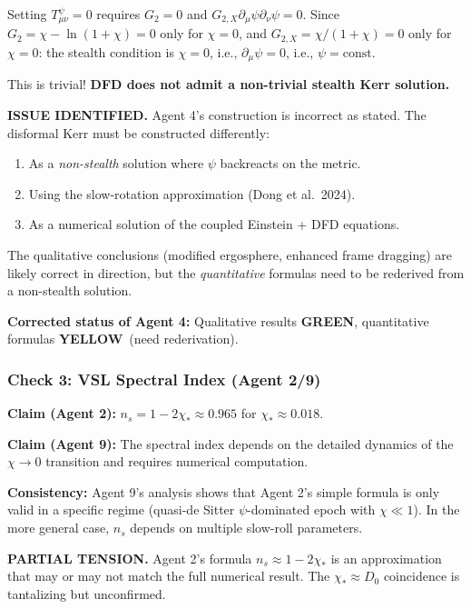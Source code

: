 \documentclass[11pt,a4paper]{article}
\newcommand{\GREEN}{\textcolor{dfdgreen}{\textbf{GREEN}}}
\newcommand{\YELLOW}{\textcolor{dfdyellow}{\textbf{YELLOW}}}
\begin{document}
Setting $T_{\mu\nu}^\psi = 0$ requires $G_2 = 0$ and $G_{2,X}\partial_\mu\psi\partial_\nu\psi = 0$. Since $G_2 = \chi - \ln(1+\chi) = 0$ only for $\chi = 0$, and $G_{2,X} = \chi/(1+\chi) = 0$ only for $\chi = 0$: the stealth condition is $\chi = 0$, i.e., $\partial_\mu\psi = 0$, i.e., $\psi = \text{const}$.

This is trivial! \textbf{DFD does not admit a non-trivial stealth Kerr solution.}

\textcolor{dfdyellow}{\textbf{ISSUE IDENTIFIED.}} Agent 4's construction is incorrect as stated. The disformal Kerr must be constructed differently:
\begin{enumerate}
\item[(a)] As a \emph{non-stealth} solution where $\psi$ backreacts on the metric.
\item[(b)] Using the slow-rotation approximation (Dong et al.\ 2024).
\item[(c)] As a numerical solution of the coupled Einstein + DFD equations.
\end{enumerate}

The qualitative conclusions (modified ergosphere, enhanced frame dragging) are likely correct in direction, but the \emph{quantitative} formulas need to be rederived from a non-stealth solution.

\textbf{Corrected status of Agent 4:} Qualitative results \GREEN, quantitative formulas \YELLOW\ (need rederivation).

\subsubsection{Check 3: VSL Spectral Index (Agent 2/9)}

\textbf{Claim (Agent 2):} $n_s = 1 - 2\chi_* \approx 0.965$ for $\chi_* \approx 0.018$.

\textbf{Claim (Agent 9):} The spectral index depends on the detailed dynamics of the $\chi \to 0$ transition and requires numerical computation.

\textbf{Consistency:} Agent 9's analysis shows that Agent 2's simple formula is only valid in a specific regime (quasi-de Sitter $\psi$-dominated epoch with $\chi \ll 1$). In the more general case, $n_s$ depends on multiple slow-roll parameters.

\textcolor{dfdyellow}{\textbf{PARTIAL TENSION.}} Agent 2's formula $n_s \approx 1 - 2\chi_*$ is an approximation that may or may not match the full numerical result. The $\chi_* \approx D_0$ coincidence is tantalizing but unconfirmed.
\end{document}
